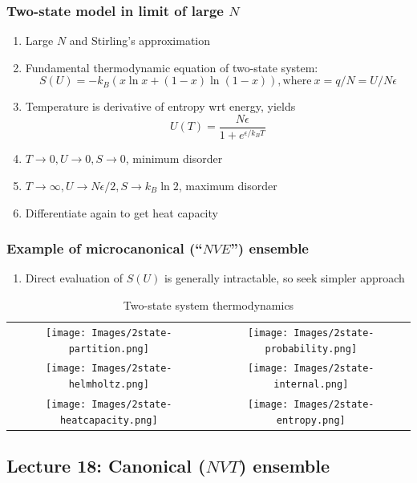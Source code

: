 \documentclass[11pt]{article}
\begin{document}
\subsubsection{Two-state model in limit of large \(N\)}
\label{sec:org169e425}
\begin{enumerate}
\item Large \(N\) and Stirling's approximation
\item Fundamental thermodynamic equation of two-state system:
\begin{displaymath}
  S(U)=-k_B \left ( x \ln x + (1-x) \ln (1-x) \right ), \mathrm{where}\
  x = q/N = U/N\epsilon
\end{displaymath}
\item Temperature is derivative of entropy wrt energy, yields
\begin{displaymath}
  U(T) = \frac{N\epsilon}{1+e^{\epsilon/k_BT}}
\end{displaymath}
\item \(T \rightarrow 0, U \rightarrow 0, S \rightarrow 0\), minimum disorder
\item \(T \rightarrow \infty, U \rightarrow N\epsilon/2, S \rightarrow k_B \ln 2\), maximum disorder
\item Differentiate again to get heat capacity
\end{enumerate}
\subsubsection{Example of microcanonical (``\(NVE\)'') ensemble}
\label{sec:org5360cfa}
\begin{enumerate}
\item Direct evaluation of \(S(U)\) is generally intractable, so seek simpler approach
\end{enumerate}
\begin{table}
   \caption{Two-state system thermodynamics}
\begin{tabular}{cc}
\texttt{[image: Images/2state-partition.png]} & \texttt{[image: Images/2state-probability.png]} \\
\texttt{[image: Images/2state-helmholtz.png]} & \texttt{[image: Images/2state-internal.png]} \\
\texttt{[image: Images/2state-heatcapacity.png]} & \texttt{[image: Images/2state-entropy.png]}
\end{tabular}
\end{table}
\subsection{Lecture 18: Canonical (\(NVT\)) ensemble}
\label{sec:org8c5bf96}
\end{document}
